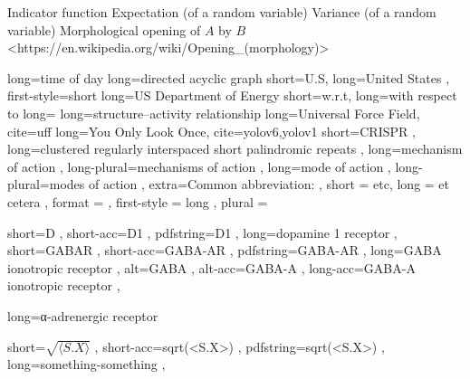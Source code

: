 \NomMath {\indicator} {Indicator function}
 {Expectation (of a random variable)}
 {Variance (of a random variable)}
    {Morphological opening of $A$ by $B$}
    <https://en.wikipedia.org/wiki/Opening\_(morphology)>




 {long=time of day}  %
 {long=directed acyclic graph}
 {
    short=U.S\acdot ,
    long=United States ,
    first-style=short     %
}
 {long=\acs{US} Department of Energy}
 {short=w.r.t\acdot, long=with respect to}
 {long=}
 {long=structure–activity relationship}  %
 {long=Universal Force Field, cite=uff}
 {long=You Only Look Once, cite={yolov6,yolov1}}
 {
    short=CRISPR ,
    long=clustered regularly interspaced short palindromic repeats ,
}
 {
    long=mechanism of action ,
	long-plural=mechanisms of action ,
}
 {
    long=mode of action ,
	long-plural=modes of action ,
	extra={Common abbreviation: } ,
}
 {
    short = etc\acdot ,
    long = et cetera ,
    format = \textit ,
    first-style = long ,
    plural =
}

 {
    short=D ,
    short-acc=D1 ,
    pdfstring=D1 ,
    long=dopamine 1 receptor ,
}
 {
    short=GABAR ,
    short-acc=GABA-AR ,
    pdfstring=GABA-AR ,
    long=GABA ionotropic receptor ,
    alt=GABA ,
    alt-acc=GABA-A ,
    long-acc=GABA-A ionotropic receptor ,
}

 {long=α-adrenergic receptor}

 {
    short=$\sqrt{\langle S . X \rangle }$ ,
    short-acc=sqrt(<S.X>) ,
    pdfstring=sqrt(<S.X>) ,
    long=something-something ,
}
